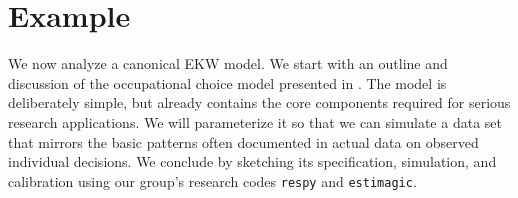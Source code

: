 \section{Example}\label{Example}
We now analyze a canonical EKW model. We start with an outline and discussion of the occupational choice model presented in \citet{Keane.1994}. The model is deliberately simple, but already contains the core components required for serious research applications. We will parameterize it so that we can simulate a data set that mirrors the basic patterns often documented in actual data on observed individual decisions. We conclude by sketching its specification, simulation, and calibration using our group's research codes \verb+respy+ and \verb+estimagic+.

